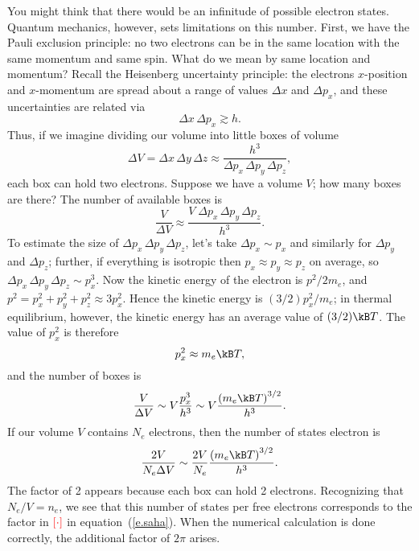 You might think that there would be an infinitude of possible electron states.  Quantum mechanics, however, sets limitations on this number. First, we have the Pauli exclusion principle: no two electrons can be in the same location with the same momentum and same spin. What do we mean by same location and momentum?  Recall the Heisenberg uncertainty principle: the electrons $x$-position and $x$-momentum are spread about a range of values $\Delta x$ and $\Delta p_{x}$, and these uncertainties are related via
\[ \Delta x\,\Delta p_{x} \gtrsim h. \]
Thus, if we imagine dividing our volume into little boxes of volume
\[ 
 \Delta V = \Delta x\,\Delta y\,\Delta z \approx \frac{h^{3}}{\Delta p_{x}\,\Delta p_{y}\,\Delta p_{z}},
\]
each box can hold two electrons. Suppose we have a volume $V$; how many boxes are there?  The number of available boxes is
\[
	\frac{V}{\Delta V} \approx \frac{V\;\Delta p_{x}\,\Delta p_{y}\,\Delta p_{z}}{h^{3}}.
\]
To estimate the size of $\Delta p_{x}\,\Delta p_{y}\,\Delta p_{z}$, let's take $\Delta p_{x}\sim p_{x}$ and similarly for $\Delta p_{y}$ and $\Delta p_{z}$; further, if everything is isotropic then $p_{x}\approx p_{y}\approx p_{z}$ on average, so $\Delta p_{x}\,\Delta p_{y}\,\Delta p_{z} \sim p_{x}^{3}$.  Now the kinetic energy of the electron is $p^{2}/2m_{e}$, and $p^{2} = p_{x}^{2} + p_{y}^{2} + p_{z}^{2} \approx 3 p_{x}^{2}$. Hence the kinetic energy is $(3/2)p_{x}^{2}/m_{e}$; in thermal equilibrium, however, the kinetic energy has an average value of $(3/2)\kB T$.  The value of $p_{x}^{2}$ is therefore
\[
	p_{x}^{2} \approx m_{e}\kB T,
\]
and the number of boxes is
\[
	\frac{V}{\Delta V} \sim V\frac{p_{x}^{3}}{h^{3}} \sim V\frac{\left(m_{e}\kB T\right)^{3/2}}{h^{3}}.
\]
If our volume $V$ contains $N_{e}$ electrons, then the number of states electron is
\[
	\frac{2V}{N_{e}\Delta V} \sim \frac{2V}{N_{e}}\frac{\left(m_{e}\kB T\right)^{3/2}}{h^{3}}.
\]
The factor of 2 appears because each box can hold 2 electrons.  Recognizing that $N_{e}/V = n_{e}$, we see that this number of states per free electrons corresponds to the factor in $\color{red}\left[\cdot\right]$ in equation~(\ref{e.saha}). When the numerical calculation is done correctly, the additional factor of $2\pi$ arises.

